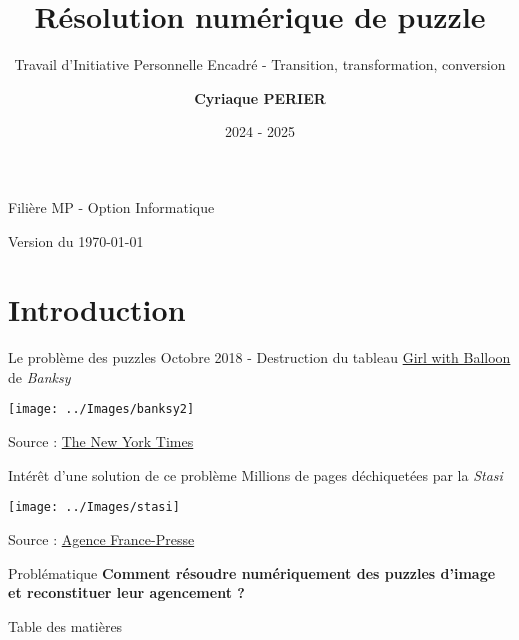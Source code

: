 \documentclass[10pt, aspectratio=43]{beamer}
\title[Résolution de puzzle]{Résolution numérique de puzzle}
\subtitle{Travail d'Initiative Personnelle Encadré - Transition, transformation, conversion}
\author[C. PERIER]{\textbf{Cyriaque PERIER}\vspace{-0.5em}}
\institute[\textbf{N\textdegree 10002}]{Candidat N\textdegree 10002 \vspace{-0.5em}}
\date{2024 - 2025}
\begin{document}
	\begin{frame}

		\vspace{-5em}

		\titlepage
		\begin{center}

			\vspace{-4em}
			Filière MP - Option Informatique

		\end{center}

		\vspace{-10em}
		\hfill
		\begin{turn}{-90}\fontsize{2.5}{4}\selectfont Version du \today\end{turn}

	\end{frame}

	\section{Introduction}
	\begin{frame}{Le problème des puzzles}
		 Octobre 2018 - Destruction du tableau \underline{Girl with Balloon} de \emph{Banksy}
		\vspace{10pt}

		\texttt{[image: ../Images/banksy2]}

		\footnotesize Source : \underline{The New York Times}
	\end{frame}
	\begin{frame}{Intérêt d'une solution de ce problème}
		 Millions de pages déchiquetées par la \emph{Stasi}
		\vspace{10pt}

		\texttt{[image: ../Images/stasi]}

		\footnotesize Source : \underline{Agence France-Presse}
	\end{frame}
	\begin{frame}{Problématique}
		\centering
		\Large \textbf{Comment résoudre numériquement des puzzles d'image et reconstituer leur agencement ?}
	\end{frame}
	\begin{frame}{Table des matières}

		
		\tableofcontents
		

	\end{frame}
\end{document}
